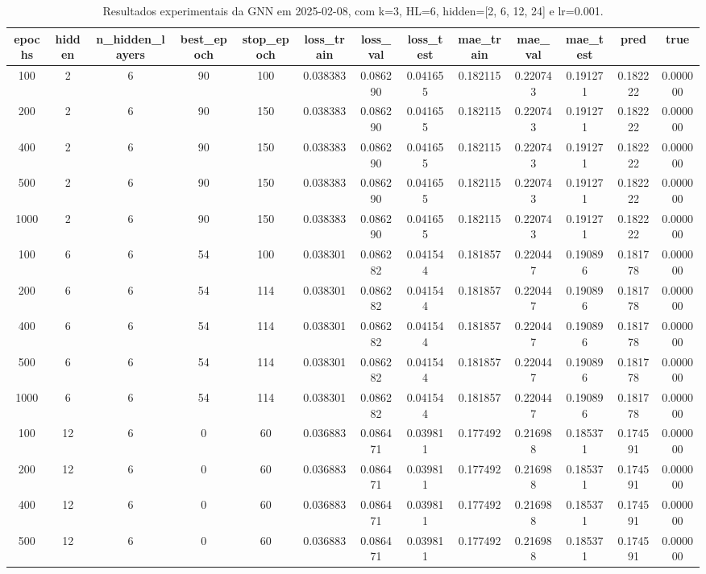 \begin{table}[h]
\centering
\caption{Resultados experimentais da GNN em 2025-02-08, com k=3, HL=6, hidden=[2, 6, 12, 24] e lr=0.001.}
\label{tab:gnn_results_k3_hl6_d20250208}
\begin{tabular}{ccccccccccccc}
\toprule
epochs & hidden & n\_hidden\_layers & best\_epoch & stop\_epoch & loss\_train & loss\_val & loss\_test & mae\_train & mae\_val & mae\_test & pred & true \\
\midrule
100 & 2 & 6 & 90 & 100 & 0.038383 & 0.086290 & 0.041655 & 0.182115 & 0.220743 & 0.191271 & 0.182222 & 0.000000 \\
200 & 2 & 6 & 90 & 150 & 0.038383 & 0.086290 & 0.041655 & 0.182115 & 0.220743 & 0.191271 & 0.182222 & 0.000000 \\
400 & 2 & 6 & 90 & 150 & 0.038383 & 0.086290 & 0.041655 & 0.182115 & 0.220743 & 0.191271 & 0.182222 & 0.000000 \\
500 & 2 & 6 & 90 & 150 & 0.038383 & 0.086290 & 0.041655 & 0.182115 & 0.220743 & 0.191271 & 0.182222 & 0.000000 \\
1000 & 2 & 6 & 90 & 150 & 0.038383 & 0.086290 & 0.041655 & 0.182115 & 0.220743 & 0.191271 & 0.182222 & 0.000000 \\
100 & 6 & 6 & 54 & 100 & 0.038301 & 0.086282 & 0.041544 & 0.181857 & 0.220447 & 0.190896 & 0.181778 & 0.000000 \\
200 & 6 & 6 & 54 & 114 & 0.038301 & 0.086282 & 0.041544 & 0.181857 & 0.220447 & 0.190896 & 0.181778 & 0.000000 \\
400 & 6 & 6 & 54 & 114 & 0.038301 & 0.086282 & 0.041544 & 0.181857 & 0.220447 & 0.190896 & 0.181778 & 0.000000 \\
500 & 6 & 6 & 54 & 114 & 0.038301 & 0.086282 & 0.041544 & 0.181857 & 0.220447 & 0.190896 & 0.181778 & 0.000000 \\
1000 & 6 & 6 & 54 & 114 & 0.038301 & 0.086282 & 0.041544 & 0.181857 & 0.220447 & 0.190896 & 0.181778 & 0.000000 \\
100 & 12 & 6 & 0 & 60 & 0.036883 & 0.086471 & 0.039811 & 0.177492 & 0.216988 & 0.185371 & 0.174591 & 0.000000 \\
200 & 12 & 6 & 0 & 60 & 0.036883 & 0.086471 & 0.039811 & 0.177492 & 0.216988 & 0.185371 & 0.174591 & 0.000000 \\
400 & 12 & 6 & 0 & 60 & 0.036883 & 0.086471 & 0.039811 & 0.177492 & 0.216988 & 0.185371 & 0.174591 & 0.000000 \\
500 & 12 & 6 & 0 & 60 & 0.036883 & 0.086471 & 0.039811 & 0.177492 & 0.216988 & 0.185371 & 0.174591 & 0.000000 \\

\end{tabular}
\end{table}
